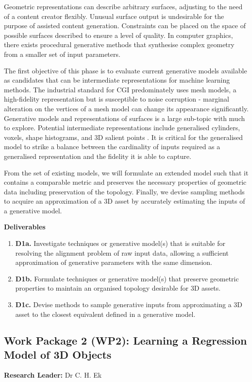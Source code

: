\documentclass[a4paper, fontsize=15pt, onecolumn]{article} %
\numberwithin{equation}{section} %
\numberwithin{figure}{section} %
\numberwithin{table}{section} %
\begin{document}
Geometric representations can describe arbitrary surfaces, adjusting to the need of a content creator flexibly. Unusual surface output is undesirable for the purpose of assisted content generation. Constraints can be placed on the space of possible surfaces described to ensure a level of quality. In computer graphics, there exists procedural generative methods that synthesise complex geometry from a smaller set of input parameters.

The first objective of this phase is to evaluate current generative models available as candidates that can be intermediate representations for machine learning methods. The industrial standard for CGI predominately uses mesh models, a high-fidelity representation but is susceptible to noise corruption - marginal alteration on the vertices of a mesh model can change its appearance significantly. Generative models and representations of surfaces is a large sub-topic with much to explore. Potential intermediate representations include generalised cylinders, voxels, shape histograms, and 3D salient points \cite{salientpoints}. It is critical for the generalised model to strike a balance between the cardinality of inputs required as a generalised representation and the fidelity it is able to capture.

From the set of existing models, we will formulate an extended model such that it contains a comparable metric and preserves the necessary properties of geometric data including preservation of the topology. Finally, we devise sampling methods to acquire an approximation of a 3D asset by accurately estimating the inputs of a generative model.

\textbf{Deliverables}
\begin{enumerate}
	\item \textbf{D1a.} Investigate techniques or generative model(s) that is suitable for resolving the alignment problem of raw input data, allowing a sufficient approximation of generative parameters with the same dimension.
	\item \textbf{D1b.} Formulate techniques or generative model(s) that preserve geometric properties to maintain an organised topology desirable for 3D assets.
	\item \textbf{D1c.} Devise methods to sample generative inputs from approximating a 3D asset to the closest equivalent defined in a generative model.
\end{enumerate}

\subsection{Work Package 2 (WP2): Learning a Regression Model of 3D Objects}
\textbf{Research Leader:} Dr C. H. Ek\par
\end{document}
